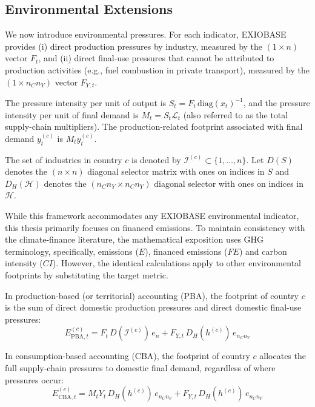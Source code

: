 \subsection{Environmental Extensions}
\label{sec:environmental extensions}

We now introduce environmental pressures. For each indicator, EXIOBASE provides 
(i) direct production pressures by industry, measured by the $(1 \times n)$ vector $F_t$, and 
(ii) direct final-use pressures that cannot be attributed to production activities (e.g., fuel combustion in private transport), measured by the $(1 \times n_C n_Y)$ vector $F_{Y,t}$. 

The pressure intensity per unit of output is $S_t = F_t \, \mathrm{diag}(x_t)^{-1}$, and the pressure intensity per unit of final demand is $M_t = S_t\mathcal{L}_t $ (also referred to as the total supply-chain multipliers). The production-related footprint associated with final demand $y_t^{(c)}$ is $M_ty_t^{(c)}$.

The set of industries in country $c$ is denoted by $\mathcal{I}^{(c)} \subset \{1, \ldots, n\}$. Let $D(S)$ denotes the $(n \times n)$ diagonal selector matrix with ones on indices in $S$ and $D_H(\mathcal{H})$ denotes the $(n_C n_Y \times n_C n_Y)$ diagonal selector with ones on indices in $\mathcal{H}$.

While this framework accommodates any EXIOBASE environmental indicator, this thesis primarily focuses on financed emissions. To maintain consistency with the climate-finance literature, the mathematical exposition uses GHG terminology, specifically, emissions ($E$), financed emissions ($FE$) and carbon intensity ($CI$). However, the identical calculations apply to other environmental footprints by substituting the target metric.

In production-based (or territorial) accounting (PBA), the footprint of country $c$ is the sum of direct domestic production pressures and direct domestic final-use pressures:
\begin{equation}
E^{(c)}_{\text{PBA},t} = F_t \, D(\mathcal{I}^{(c)}) \, e_n + F_{Y,t} \, D_H(h^{(c)}) \, e_{n_C n_Y}
\end{equation}

In consumption-based accounting (CBA), the footprint of country $c$ allocates the full supply-chain pressures to domestic final demand, regardless of where pressures occur:
\begin{equation}
E^{(c)}_{\text{CBA},t} = M_t Y_t \, D_H(h^{(c)}) \, e_{n_C n_Y} + F_{Y,t} \, D_H(h^{(c)}) \, e_{n_C n_Y}
\end{equation}

